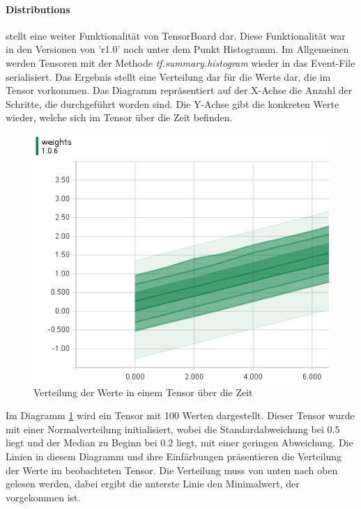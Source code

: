 \paragraph{Distributions} stellt eine weiter Funktionalität von TensorBoard dar.  %
Diese Funktionalität war in den Versionen von 'r1.0' noch unter dem Punkt Histogramm. 
Im Allgemeinen werden Tensoren mit der Methode \textit{tf.summary.histogram} wieder in das Event-File serialisiert. 
Das Ergebnis stellt eine Verteilung dar für die Werte dar, die im Tensor vorkommen. 
Das Diagramm repräsentiert auf der X-Achse die Anzahl der Schritte, die durchgeführt worden sind. 
Die Y-Achse gibt die konkreten Werte wieder, welche sich im Tensor über die Zeit befinden. 
\begin{figure}
	\centering
	\includegraphics[scale=0.8]{images/Distripution-small.png}
	\caption{Verteilung der Werte in einem Tensor über die Zeit}
	\label{fig:Verteilungsdiagram}
\end{figure}
Im Diagramm \ref{fig:Verteilungsdiagram} wird ein Tensor mit 100 Werten dargestellt. 
Dieser Tensor wurde mit einer Normalverteilung initialisiert, wobei die Standardabweichung bei $0.5$ liegt und der Median zu Beginn bei $0.2$ liegt, mit einer geringen Abweichung. 
Die Linien in diesem Diagramm und ihre Einfärbungen präsentieren die Verteilung der Werte im beobachteten Tensor. 
Die Verteilung muss von unten nach oben gelesen werden, dabei ergibt die unterste Linie den Minimalwert, der vorgekommen ist. 
